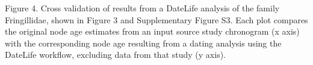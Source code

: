 \documentclass[english,man]{apa6}
\begin{document}
Figure 4. Cross validation of results from a DateLife analysis of the family Fringillidae, shown in Figure 3 and Supplementary Figure S3. Each plot compares the original node age estimates from an input source study chronogram (x axis) with the corresponding node age resulting from a dating analysis using the DateLife workflow, excluding data from that study (y axis).
\end{document}
